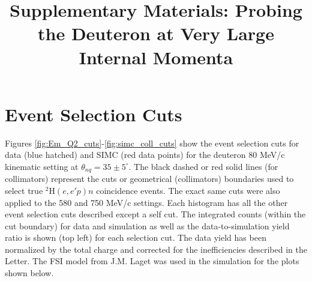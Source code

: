 \documentclass[aps, prl]{revtex4-2}  %
\begin{document}
\title{Supplementary Materials: Probing the Deuteron at Very Large Internal Momenta}
\maketitle
\section{\large Event Selection Cuts}
\indent Figures \ref{fig:Em_Q2_cuts}-\ref{fig:simc_coll_cuts} show the event selection cuts for data (blue hatched) and SIMC (red data points) for the deuteron 80 MeV/c kinematic setting at $\theta_{nq}=35\pm5^{\circ}$.
The black dashed or red solid lines (for collimators) represent the cuts or geometrical (collimators) boundaries used to select true $^{2}$H$(e,e'p)n$ coincidence events.
The exact same cuts were also applied to the 580 and 750 MeV/c settings. Each histogram has all the other event selection cuts described except a self cut.
The integrated counts (within the cut boundary) for data and simulation as well as the data-to-simulation yield ratio is shown (top left) for each selection cut.
The data yield has been normalized by the total charge and corrected for the inefficiencies described in the Letter. The FSI model from J.M. Laget was used in the simulation for the plots shown below.
\end{document}
